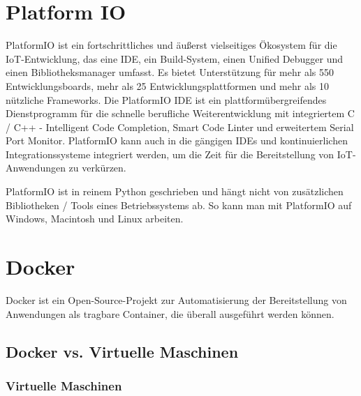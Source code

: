 \cite[Zitiert von der offizielen Nodejs Website]{nodejs_event_loop_how_does_it_work}

\section{Platform IO}\label{sec:platformio}

PlatformIO ist ein fortschrittliches und äußerst vielseitiges Ökosystem für die IoT-Entwicklung, das eine IDE, ein Build-System, einen Unified Debugger und einen Bibliotheksmanager umfasst. Es bietet Unterstützung für mehr als 550 Entwicklungsboards, mehr als 25 Entwicklungsplattformen und mehr als 10 nützliche Frameworks. Die PlatformIO IDE ist ein plattformübergreifendes Dienstprogramm für die schnelle berufliche Weiterentwicklung mit integriertem C / C++ - Intelligent Code Completion, Smart Code Linter und erweitertem Serial Port Monitor. PlatformIO kann auch in die gängigen IDEs und kontinuierlichen Integrationssysteme integriert werden, um die Zeit für die Bereitstellung von IoT-Anwendungen zu verkürzen.\cite{platformio_about_us}

PlatformIO ist in reinem Python geschrieben und hängt nicht von zusätzlichen Bibliotheken / Tools eines Betriebssystems ab. So kann man mit PlatformIO auf Windows, Macintosh und Linux arbeiten.

\section{Docker}\label{sec:docker}

Docker ist ein Open-Source-Projekt zur Automatisierung der Bereitstellung von Anwendungen als tragbare Container, die überall ausgeführt werden können. 

\subsection{Docker vs. Virtuelle Maschinen}\label{sec:docker-vm}

\subsubsection{Virtuelle Maschinen}

